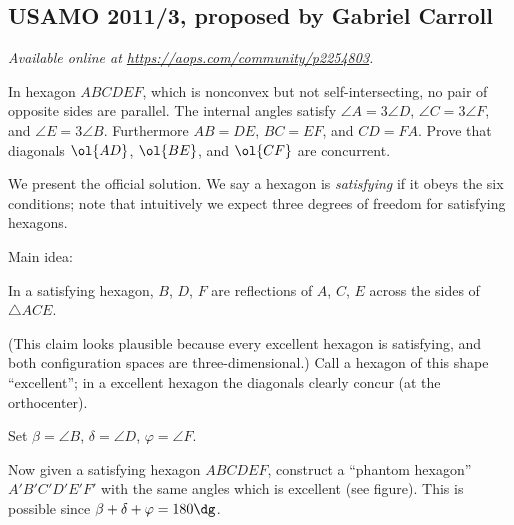 \documentclass[11pt]{scrartcl}
\begin{document}
\subsection{USAMO 2011/3, proposed by Gabriel Carroll}
\textsl{Available online at \url{https://aops.com/community/p2254803}.}
\begin{mdframed}[style=mdpurplebox,frametitle={Problem statement}]
In hexagon $ABCDEF$, which is nonconvex but not self-intersecting,
no pair of opposite sides are parallel.
The internal angles satisfy
$\angle A=3\angle D$, $\angle C=3\angle F$, and $\angle E=3\angle B$.
Furthermore $AB=DE$, $BC=EF$, and $CD=FA$.
Prove that diagonals $\ol{AD}$, $\ol{BE}$, and $\ol{CF}$
are concurrent.
\end{mdframed}
We present the official solution.
We say a hexagon is \emph{satisfying}
if it obeys the six conditions;
note that intuitively we expect three degrees of freedom
for satisfying hexagons.

Main idea:
\begin{claim*}
In a satisfying hexagon,
$B$, $D$, $F$ are reflections of $A$, $C$, $E$ across
the sides of $\triangle ACE$.
\end{claim*}
(This claim looks plausible because every excellent hexagon is satisfying,
and both configuration spaces are three-dimensional.)
Call a hexagon of this shape ``excellent'';
in a excellent hexagon the diagonals clearly concur (at the orthocenter).

Set $\beta = \angle B$, $\delta = \angle D$, $\varphi = \angle F$.

Now given a satisfying hexagon $ABCDEF$,
construct a ``phantom hexagon'' $A'B'C'D'E'F'$
with the same angles which is excellent (see figure).
This is possible since $\beta + \delta + \varphi = 180\dg$.
\end{document}

